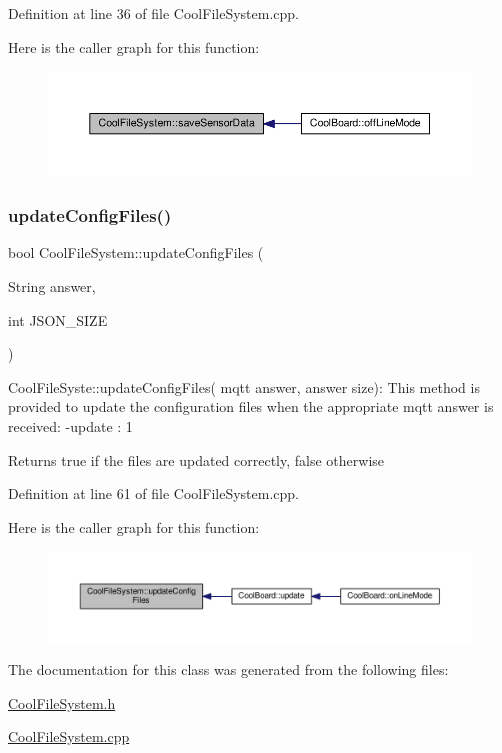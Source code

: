 Definition at line 36 of file Cool\+File\+System.\+cpp.

Here is the caller graph for this function\+:\nopagebreak
\begin{figure}[H]
\begin{center}
\leavevmode
\includegraphics[width=350pt]{class_cool_file_system_a4c560c2ddd40b74b7758e6ceb2c58957_icgraph}
\end{center}
\end{figure}
\mbox{\label{class_cool_file_system_a32dad79ae80182a83e2e8f52286b7c7b}} 
\subsubsection{\texorpdfstring{update\+Config\+Files()}{updateConfigFiles()}}
{\footnotesize\ttfamily bool Cool\+File\+System\+::update\+Config\+Files (\begin{DoxyParamCaption}\item[{String}]{answer,  }\item[{int}]{J\+S\+O\+N\+\_\+\+S\+I\+ZE }\end{DoxyParamCaption})}

Cool\+File\+Syste\+::update\+Config\+Files( mqtt answer, answer size)\+: This method is provided to update the configuration files when the appropriate mqtt answer is received\+: -\/update \+: 1

\begin{DoxyReturn}{Returns}
true if the files are updated correctly, false otherwise 
\end{DoxyReturn}


Definition at line 61 of file Cool\+File\+System.\+cpp.

Here is the caller graph for this function\+:\nopagebreak
\begin{figure}[H]
\begin{center}
\leavevmode
\includegraphics[width=350pt]{class_cool_file_system_a32dad79ae80182a83e2e8f52286b7c7b_icgraph}
\end{center}
\end{figure}


The documentation for this class was generated from the following files\+:\begin{DoxyCompactItemize}
\item 
\hyperlink{_cool_file_system_8h}{Cool\+File\+System.\+h}\item 
\hyperlink{_cool_file_system_8cpp}{Cool\+File\+System.\+cpp}\end{DoxyCompactItemize}
